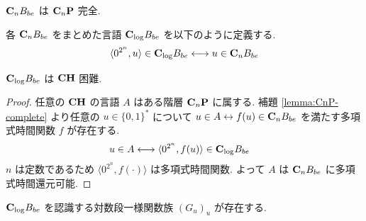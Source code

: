 \begin{lemma} \label{lemma:CnP-complete}
 $\mathbf{C}_n B_{be}$ は $\mathbf{C}_n\mathbf{P}$ 完全.
\end{lemma}


各 $\mathbf{C}_n B_{be}$ をまとめた言語 $\mathbf{C}_{\log} B_{be}$ を以下のように定義する.
\[
 \langle 0^{2^n}, u \rangle \in \mathbf{C}_{\log} B_{be}
 \longleftrightarrow
 u \in \mathbf{C}_n B_{be}
\]

\begin{lemma}
 $\mathbf{C}_{\log} B_{be}$ は $\mathbf{CH}$ 困難.
\end{lemma}

\begin{proof}
 任意の $\mathbf{CH}$ の言語 $A$ はある階層 $\mathbf{C}_n \mathbf{P}$ に属する. 
 補題 \ref{lemma:CnP-complete} より任意の $u \in \{0,1\}^*$ について
 $u \in A \leftrightarrow f(u) \in \mathbf{C}_n B_{be}$ 
 を満たす多項式時間関数 $f$ が存在する.
 \begin{align}
  u \in A 
  & \longleftrightarrow \langle 0^{2^n}, f(u) \rangle \in \mathbf{C}_{\log} B_{be}
 \end{align}
 $n$ は定数であるため $\langle 0^{2^n}, f(\cdot) \rangle$ は多項式時間関数.
 よって $A$ は $\mathbf{C}_n B_{be}$ に多項式時間還元可能.
\end{proof}

\begin{lemma}
 $\mathbf{C}_{\log} B_{be}$ を認識する対数段一様関数族 $(G_u)_u$ が存在する.
\end{lemma}

